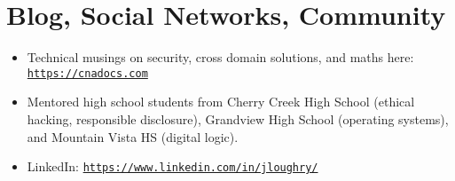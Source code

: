 \section*{Blog, Social Networks, Community}
\vspace{-3mm}

\begin{itemize}
    \item Technical musings on security, cross domain solutions, and maths
        here:
        \href{https://cnadocs.com}{\nolinkurl{https://cnadocs.com}}\vspace{-1mm}
    \item Mentored high school students from Cherry Creek High School
        (ethical hacking, responsible disclosure), Grandview High School
        (operating systems), and Mountain Vista HS (digital logic).\vspace{-1mm}
    \item LinkedIn:
        \href{https://www.linkedin.com/in/jloughry/}{\nolinkurl{https://www.linkedin.com/in/jloughry/}}
\end{itemize}

